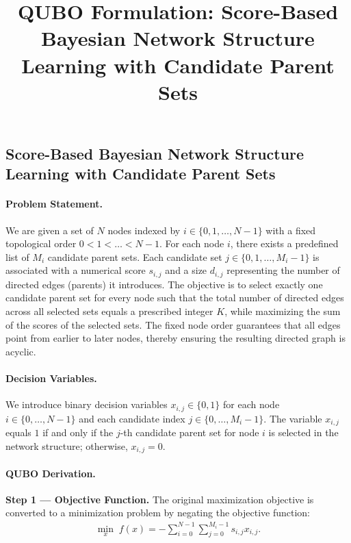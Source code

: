 \documentclass[12pt]{article}
\title{QUBO Formulation: Score-Based Bayesian Network Structure Learning with Candidate Parent Sets}
\date{}
\begin{document}
\maketitle

\subsection*{Score-Based Bayesian Network Structure Learning with Candidate Parent Sets}

\paragraph{Problem Statement.}
We are given a set of $N$ nodes indexed by $i \in \{0, 1, \dots, N-1\}$ with a fixed topological order $0 < 1 < \dots < N-1$. For each node $i$, there exists a predefined list of $M_i$ candidate parent sets. Each candidate set $j \in \{0, 1, \dots, M_i-1\}$ is associated with a numerical score $s_{i,j}$ and a size $d_{i,j}$ representing the number of directed edges (parents) it introduces. The objective is to select exactly one candidate parent set for every node such that the total number of directed edges across all selected sets equals a prescribed integer $K$, while maximizing the sum of the scores of the selected sets. The fixed node order guarantees that all edges point from earlier to later nodes, thereby ensuring the resulting directed graph is acyclic.

\paragraph{Decision Variables.}
We introduce binary decision variables $x_{i,j} \in \{0,1\}$ for each node $i \in \{0, \dots, N-1\}$ and each candidate index $j \in \{0, \dots, M_i-1\}$. The variable $x_{i,j}$ equals $1$ if and only if the $j$-th candidate parent set for node $i$ is selected in the network structure; otherwise, $x_{i,j} = 0$.

\paragraph{QUBO Derivation.}
\textbf{Step 1 --- Objective Function.} The original maximization objective is converted to a minimization problem by negating the objective function:
\begin{align}
    \min_{x} \; f(x) = -\sum_{i=0}^{N-1} \sum_{j=0}^{M_i-1} s_{i,j} x_{i,j}.
\end{align}
\end{document}
